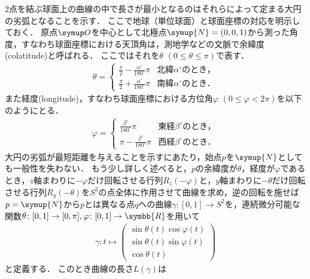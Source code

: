 \documentclass{ltjsbook}
\begin{document}
\begin{specialexample}
\(2\)点を結ぶ球面上の曲線の中で長さが最小となるのはそれらによって定まる大円の劣弧となることを示す．
ここで地球（単位球面）と球面座標の対応を明示しておく．
原点\(\origin\)を中心として北極点\(\symup{N} = (0, 0, 1)\)から測った角度，すなわち球面座標における天頂角は，測地学などの文脈で余緯度(colatitude)と呼ばれる．
ここではそれを\(\theta\) \((0 \leq \theta \leq \pi)\)で表す．
\begin{align*}
    \theta = \begin{cases}
        \displaystyle
        \frac{\pi}{2} - \frac{\alpha^\circ}{180^\circ} \pi
        & \text{北緯\(\alpha^\circ\)のとき，} \\[10pt]
        \displaystyle
        \frac{\pi}{2} + \frac{\alpha^\circ}{180^\circ} \pi
        & \text{南緯\(\alpha^\circ\)のとき．}
    \end{cases}
\end{align*}
また経度(longitude)，すなわち球面座標における方位角\(\varphi\) \((0 \leq \varphi < 2\pi)\)を以下のようにとる．
\begin{align*}
    \varphi = \begin{cases}
        \displaystyle
        \frac{\beta^\circ}{180^\circ} \pi
        & \text{東経\(\beta^\circ\)のとき，} \\[10pt]
        \displaystyle
        \pi - \frac{\beta^\circ}{180^\circ} \pi
        & \text{西経\(\beta^\circ\)のとき．}
    \end{cases}
\end{align*}
大円の劣弧が最短距離を与えることを示すにあたり，始点\(p\)を\(\symup{N}\)としても一般性を失わない．
もう少し詳しく述べると，\(p\)の余緯度が\(\theta\)，経度が\(\varphi\)であるとき，\(z\)軸まわりに\(-\varphi\)だけ回転させる行列\(R_z(-\varphi)\)と，\(y\)軸まわりに\(-\theta\)だけ回転させる行列\(R_y(-\theta)\)を\(S^2\)の点全体に作用させて曲線を求め，逆の回転を施せば
\(p = \symup{N}\)から\(p\)とは異なる点\(q\)への曲線\(\gamma \colon [0, 1] \to S^2\)を，連続微分可能な関数\(\theta \colon [0, 1] \to [0, \pi], \varphi \colon [0, 1] \to \symbb{R}\)を用いて
\begin{align*}
    \gamma \colon t \mapsto
        \begin{pmatrix}
            \sin \theta(t) \cos \varphi(t) \\
            \sin \theta(t) \sin \varphi(t) \\
            \cos \theta(t)
        \end{pmatrix}
\end{align*}
と定義する．
このとき曲線の長さ\(L(\gamma)\)は
\begin{align*}

\end{align*}
\end{specialexample}
\end{document}
